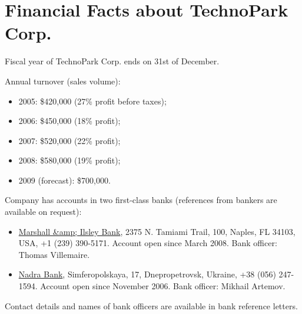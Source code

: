 \section*{Financial Facts about TechnoPark Corp.}

Fiscal year of TechnoPark Corp. ends on 31st of December.

Annual turnover (sales volume):
\begin{itemize}
	\item 2005: \$420,000 (27\% profit before taxes);
	\item 2006: \$450,000 (18\% profit);
	\item 2007: \$520,000 (22\% profit);
	\item 2008: \$580,000 (19\% profit);
	\item 2009 (forecast): \$700,000.
\end{itemize}	

Company has accounts in two first-class banks 
(references from bankers are available on request):
\begin{itemize}
	
	\item \href{http://www.mibank.com}{Marshall &amp; Ilsley Bank}, 
	2375 N. Tamiami Trail, 100, Naples, FL 34103, USA, +1 (239) 390-5171.
	Account open since March 2008. Bank officer: Thomas Villemaire.

	\item \href{http://nadra.com.ua/eng/to-you}{Nadra Bank}, 
	Simferopolskaya, 17, Dnepropetrovsk, Ukraine, +38 (056) 247-1594.
	Account open since November 2006. Bank officer: Mikhail Artemov.

\end{itemize}	

Contact details and names of bank officers are available in 
bank reference letters.
